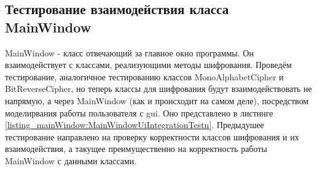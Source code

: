 \documentclass[a4paper,12pt]{article}
\begin{document}
\newpage\subsection{Тестирование взаимодействия класса MainWindow}
MainWindow - класс отвечающий за главное окно программы. Он взаимодействует с классами, реализующими методы шифрования. Проведём тестирование, аналогичное тестированию классов MonoAlphabetCipher и BitReverseCipher, но теперь классы для шифрования будут взаимодействовать не напрямую, а через MainWindow (как и происходит на самом деле), посредством моделирвания работы пользователя с gui. Оно представлено в листинге \ref{listing_mainWindow:MainWindowUiIntegrationTestn}. Предыдушее тестирование направлено на проверку корректности классов шифрования и их взаимодействия, а такущее преимущественно на корректность работы MainWindow с данными классами.
\end{document}
